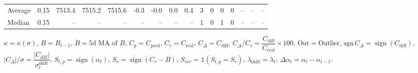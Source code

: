 \begin{threeparttable}
{\begin{tabular}{lrrrrrrrrrrrrrrr}
Average &     0.15 & 7513.4 & 7515.2 & 7515.6 &       -0.3 &           -0.0 &                      0.0 &                 0.4 &              3 &         0 &     0 &         0 &         -- &        -- &             -- \\
 Median &     0.15 &     -- &     -- &     -- &         -- &             -- &                       -- &                  -- &              1 &         0 &     1 &         0 &         -- &        -- &             -- \\
\bottomrule
\end{tabular}
}
\begin{tablenotes}\footnotesize
\item $\kappa=\kappa(\sigma)$, $B=B_{t-1}$, $\overline{B}=\text{5d MA of }B$, $C_p=C_{\text{pred}}$, $C_r=C_{\text{real}}$, $C_\Delta=C_{\text{diff}}$, $C_\Delta/C_r=\dfrac{C_{\text{diff}}}{C_{\text{real}}}\times100$, $\mathrm{Out}=\text{Outlier}$, $\mathrm{sgn}\,C_\Delta=\operatorname{sign}(C_{\text{diff}})$, $|C_\Delta|/\sigma=\dfrac{|C_{\text{diff}}|}{\sigma_t^{\text{shift}}}$, $S_{t,p}=\operatorname{sign}(\alpha_t)$, $S_r=\operatorname{sign}(C_r - B)$, $S_{ver}=\mathbb{1}(S_{t,p}=S_r)$, $\lambda_{\text{shift}}=\lambda_t$, $\Delta\alpha_t=\alpha_t-\alpha_{t-1}$.\end{tablenotes}
\end{threeparttable}
\endgroup

